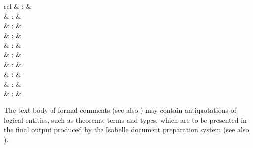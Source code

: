\begin{isabellebody}
\begin{isamarkuptext}
\begin{matharray}{rcl}
    \hypertarget{antiquotation.thm-style}{\hyperlink{antiquotation.thm-style}{\mbox{}}} & : & \isarantiq \\
    \hypertarget{antiquotation.term-style}{\hyperlink{antiquotation.term-style}{\mbox{}}} & : & \isarantiq \\
    \hypertarget{antiquotation.text}{\hyperlink{antiquotation.text}{\mbox{}}} & : & \isarantiq \\
    \hypertarget{antiquotation.goals}{\hyperlink{antiquotation.goals}{\mbox{}}} & : & \isarantiq \\
    \hypertarget{antiquotation.subgoals}{\hyperlink{antiquotation.subgoals}{\mbox{}}} & : & \isarantiq \\
    \hypertarget{antiquotation.prf}{\hyperlink{antiquotation.prf}{\mbox{}}} & : & \isarantiq \\
    \hypertarget{antiquotation.full-prf}{\hyperlink{antiquotation.full-prf}{\mbox{}}} & : & \isarantiq \\
    \hypertarget{antiquotation.ML}{\hyperlink{antiquotation.ML}{\mbox{}}} & : & \isarantiq \\
    \hypertarget{antiquotation.ML-type}{\hyperlink{antiquotation.ML-type}{\mbox{}}} & : & \isarantiq \\
    \hypertarget{antiquotation.ML-struct}{\hyperlink{antiquotation.ML-struct}{\mbox{}}} & : & \isarantiq \\
  \end{matharray}

  The text body of formal comments (see also )
  may contain antiquotations of logical entities, such as theorems,
  terms and types, which are to be presented in the final output
  produced by the Isabelle document preparation system (see also
  ).


\end{isamarkuptext}
\end{isabellebody}
